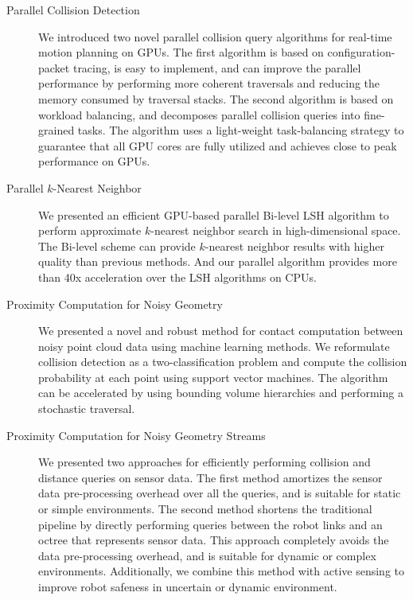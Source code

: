 \begin{description}
\item[Parallel Collision Detection] We introduced two novel parallel collision query algorithms for real-time motion planning on GPUs. The first algorithm is based on configuration-packet tracing, is easy to implement, and can improve the parallel performance by performing more coherent traversals and reducing the memory consumed by traversal stacks. The second algorithm is based on workload balancing, and
    decomposes parallel collision queries into fine-grained tasks. The algorithm uses a light-weight task-balancing strategy to guarantee that all GPU cores are fully utilized and achieves close to peak performance on GPUs.
\item[Parallel $k$-Nearest Neighbor] We presented an efficient GPU-based parallel Bi-level LSH algorithm to perform approximate $k$-nearest neighbor search in high-dimensional space. The Bi-level scheme can provide $k$-nearest neighbor results with higher quality than previous methods. And our parallel algorithm provides more than 40x acceleration over the LSH algorithms on CPUs.
\item[Proximity Computation for Noisy Geometry] We presented a novel and robust method for contact computation between noisy point cloud data using machine learning methods. We reformulate collision detection as a two-classification problem and compute the collision probability at each point using support vector machines. The algorithm can be accelerated by using bounding volume hierarchies and performing a stochastic traversal.
\item[Proximity Computation for Noisy Geometry Streams] We presented two approaches for efficiently performing collision and distance queries on sensor data. The first method amortizes the sensor data pre-processing overhead over all the queries, and is suitable for static or simple environments. The second method shortens the traditional pipeline by directly performing queries between the robot links and an octree that represents sensor data. This approach completely avoids the data pre-processing overhead, and is suitable for dynamic or complex environments. Additionally, we combine this method with active sensing to improve robot safeness in uncertain or dynamic environment.
\end{description}

